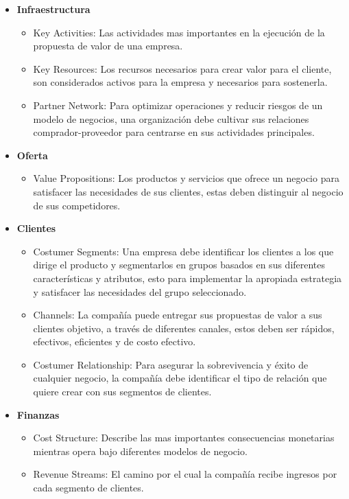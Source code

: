 \documentclass[spanish,12pt,letterpapper]{article}
\begin{document}
	\begin{itemize}
		\item \textbf{Infraestructura} 
		\begin{itemize}
			\item Key Activities: Las actividades mas importantes en la ejecución de la propuesta de valor de una empresa. 
			\item Key Resources: Los recursos necesarios para crear valor para el cliente, son considerados activos para la empresa y necesarios para sostenerla.
			\item Partner Network: Para optimizar operaciones y reducir riesgos de un modelo de negocios, una organización debe cultivar sus relaciones comprador-proveedor para centrarse en sus actividades principales.  \\
		\end{itemize}
		\item \textbf{Oferta}
		\begin{itemize}
			\item Value Propositions: Los productos y servicios que ofrece un negocio para satisfacer las necesidades de sus clientes, estas deben distinguir al negocio de sus competidores. \\
		\end{itemize}
		\item \textbf{Clientes}
		\begin{itemize}
			\item Costumer Segments: Una empresa debe identificar los clientes a los que dirige el producto y segmentarlos en grupos basados en sus diferentes características y atributos, esto para implementar la apropiada estrategia y satisfacer las necesidades del grupo seleccionado.
			\item Channels: La compañía puede entregar sus propuestas de valor a sus clientes objetivo, a través de diferentes canales, estos deben ser rápidos, efectivos, eficientes y de costo efectivo. 
			\item Costumer Relationship: Para asegurar la sobrevivencia y éxito de cualquier negocio, la compañía debe identificar el tipo de relación que quiere crear con sus segmentos de clientes.
		\end{itemize}
		\item \textbf{Finanzas} 
		\begin{itemize}
			\item Cost Structure: Describe las mas importantes consecuencias monetarias mientras opera bajo diferentes modelos de negocio.
			\item Revenue Streams: El camino por el cual la compañía recibe ingresos por cada segmento de clientes. \\
		\end{itemize}
	\end{itemize}
\end{document}
